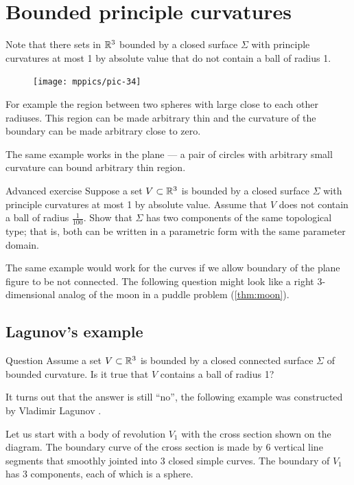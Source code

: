 \chapter{Bounded principle curvatures}

Note that there sets in $\mathbb{R}^3$ bounded by a closed surface $\Sigma$ with principle curvatures at most 1 by absolute value
that do not contain a ball of radius 1.

\begin{figure}
\vskip-4mm
\centering
\texttt{[image: mppics/pic-34]}
\vskip0mm
\end{figure}

For example the region between two spheres with large close to each other radiuses. 
This region can be made arbitrary thin and the curvature of the boundary can be made arbitrary close to zero.

The same example works in the plane --- a pair of circles with arbitrary small curvature can bound arbitrary thin region.

\begin{thm}{Advanced exercise}
Suppose a set $V\subset \mathbb{R}^3$ is bounded by a closed surface $\Sigma$ with principle curvatures at most 1 by absolute value.
Assume that $V$ does not contain a ball of radius $\tfrac1{100}$.
Show that $\Sigma$ has two components of the same topological type; 
that is, both can be written in a parametric form with the same parameter domain. 
\end{thm}


The same example would work for the curves if we allow boundary of the plane figure to be not connected.
The following question might look like a right 3-dimensional analog of the moon in a puddle problem (\ref{thm:moon}).

\section{Lagunov's example}

\begin{thm}{Question}
Assume a set $V\subset \mathbb{R}^3$ is bounded by a closed connected surface $\Sigma$ of bounded curvature.
Is it true that $V$ contains a ball of radius 1?
\end{thm}

It turns out that the answer is still ``no'', the following example was constructed by Vladimir Lagunov \cite{lagunov}.


Let us start with a body of revolution $V_1$ with the cross section shown on the diagram.
The boundary curve of the cross section is made by 6 vertical line segments that smoothly jointed into 3 closed simple curves. 
The boundary of $V_1$ has 3 components, each of which is a sphere.


